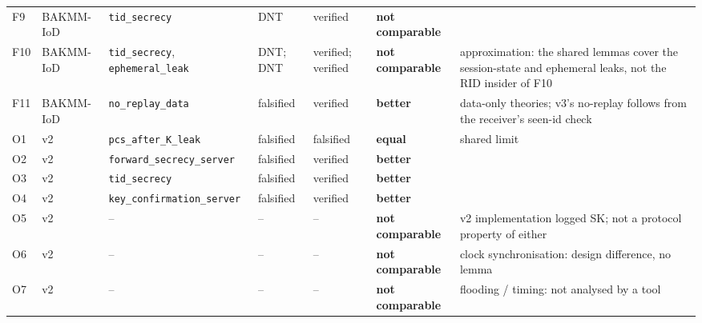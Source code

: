 \begin{table}[!t]
\begin{tabular}{llp{3.0cm}p{2.1cm}p{1.7cm}lp{3.6cm}}
F9 & BAKMM-IoD & \texttt{tid\_\allowbreak{}secrecy} & DNT & verified & \textbf{not comparable} &  \\
F10 & BAKMM-IoD & \texttt{tid\_\allowbreak{}secrecy}, \texttt{ephemeral\_\allowbreak{}leak} & DNT; DNT & verified; verified & \textbf{not comparable} & approximation: the shared lemmas cover the session-state and ephemeral leaks, not the RID insider of F10 \\
F11 & BAKMM-IoD & \texttt{no\_\allowbreak{}replay\_\allowbreak{}data} & falsified & verified & \textbf{better} & data-only theories; v3's no-replay follows from the receiver's seen-id check \\
O1 & v2 & \texttt{pcs\_\allowbreak{}after\_\allowbreak{}K\_\allowbreak{}leak} & falsified & falsified & \textbf{equal} & shared limit \\
O2 & v2 & \texttt{forward\_\allowbreak{}secrecy\_\allowbreak{}server} & falsified & verified & \textbf{better} &  \\
O3 & v2 & \texttt{tid\_\allowbreak{}secrecy} & falsified & verified & \textbf{better} &  \\
O4 & v2 & \texttt{key\_\allowbreak{}confirmation\_\allowbreak{}server} & falsified & verified & \textbf{better} &  \\
O5 & v2 & -- & -- & -- & \textbf{not comparable} & v2 implementation logged SK; not a protocol property of either \\
O6 & v2 & -- & -- & -- & \textbf{not comparable} & clock synchronisation: design difference, no lemma \\
O7 & v2 & -- & -- & -- & \textbf{not comparable} & flooding / timing: not analysed by a tool \\
\bottomrule
\end{tabular}
\end{table}
